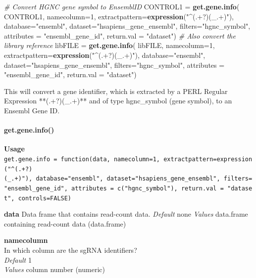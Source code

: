 \documentclass[]{article}
\newenvironment{Shaded}{\begin{snugshade}}{\end{snugshade}}
\newcommand{\KeywordTok}[1]{\textcolor[rgb]{0.13,0.29,0.53}{\textbf{{#1}}}}
\newcommand{\DataTypeTok}[1]{\textcolor[rgb]{0.13,0.29,0.53}{{#1}}}
\newcommand{\DecValTok}[1]{\textcolor[rgb]{0.00,0.00,0.81}{{#1}}}
\newcommand{\StringTok}[1]{\textcolor[rgb]{0.31,0.60,0.02}{{#1}}}
\newcommand{\CommentTok}[1]{\textcolor[rgb]{0.56,0.35,0.01}{\textit{{#1}}}}
\newcommand{\NormalTok}[1]{{#1}}
\let\oldparagraph\paragraph
\renewcommand{\paragraph}[1]{\oldparagraph{#1}\mbox{}}
\begin{document}
\begin{Shaded}
\begin{Highlighting}[]
\CommentTok{# Convert HGNC gene symbol to EnsemblID}
\NormalTok{CONTROL1 =}\StringTok{ }\KeywordTok{get.gene.info}\NormalTok{(}
  \NormalTok{CONTROL1, }\DataTypeTok{namecolumn=}\DecValTok{1}\NormalTok{, }\DataTypeTok{extractpattern=}\KeywordTok{expression}\NormalTok{(}\StringTok{"^(.+?)(_.+)"}\NormalTok{),}
  \DataTypeTok{database=}\StringTok{"ensembl"}\NormalTok{, }\DataTypeTok{dataset=}\StringTok{"hsapiens_gene_ensembl"}\NormalTok{, }\DataTypeTok{filters=}\StringTok{"hgnc_symbol"}\NormalTok{,}
  \DataTypeTok{attributes =} \StringTok{"ensembl_gene_id"}\NormalTok{, }\DataTypeTok{return.val =} \StringTok{"dataset"}\NormalTok{)}
\CommentTok{# Also convert the library reference}
\NormalTok{libFILE =}\StringTok{ }\KeywordTok{get.gene.info}\NormalTok{(}
  \NormalTok{libFILE, }\DataTypeTok{namecolumn=}\DecValTok{1}\NormalTok{, }\DataTypeTok{extractpattern=}\KeywordTok{expression}\NormalTok{(}\StringTok{"^(.+?)(_.+)"}\NormalTok{),}
  \DataTypeTok{database=}\StringTok{"ensembl"}\NormalTok{, }\DataTypeTok{dataset=}\StringTok{"hsapiens_gene_ensembl"}\NormalTok{, }\DataTypeTok{filters=}\StringTok{"hgnc_symbol"}\NormalTok{,}
  \DataTypeTok{attributes =} \StringTok{"ensembl_gene_id"}\NormalTok{, }\DataTypeTok{return.val =} \StringTok{"dataset"}\NormalTok{)}
\end{Highlighting}
\end{Shaded}

This will convert a gene identifier, which is extracted by a PERL
Regular Expression **(.+?)(\_.+)** and of type hgnc\_symbol (gene
symbol), to an Ensembl Gene ID.

\paragraph{get.gene.info()}\label{get.gene.info}

\textbf{Usage}\\
\texttt{get.gene.info\ =\ function(data,\ namecolumn=1,\ extractpattern=expression("\^{}(.+?)(\_.+)"),\ database="ensembl",\ dataset="hsapiens\_gene\_ensembl",\ filters="ensembl\_gene\_id",\ attributes\ =\ c("hgnc\_symbol"),\ return.val\ =\ "dataset",\ controls=FALSE)}

\textbf{data} Data frame that contains read-count data. \emph{Default}
none \emph{Values} data.frame containing read-count data (data.frame)

\textbf{namecolumn}\\
In which column are the sgRNA identifiers?\\
\emph{Default} 1\\
\emph{Values} column number (numeric)
\end{document}
